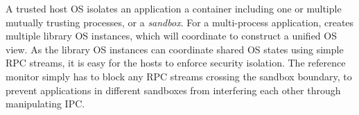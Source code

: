 A trusted host OS isolates an application a container including one or multiple mutually trusting processes, or a {\em sandbox}.
For a multi-process application, \graphene{} creates multiple library OS instances,
which will coordinate to construct a unified OS view.
As the library OS instances can coordinate shared OS states using simple RPC streams,
it is easy for the hosts to enforce security isolation.
The reference monitor simply has to block any RPC streams crossing the sandbox boundary,
to prevent applications in different sandboxes from interfering each other through manipulating IPC.

